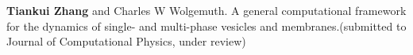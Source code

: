 
\begin{cventries}

  \cventry
    {} %
    {} %
    {} %
    {} %
    {
      \begin{cvitems} %
      	\item {\textbf{Tiankui Zhang} and Charles W Wolgemuth. A general computational framework for the dynamics of single- and multi-phase vesicles and membranes.(submitted to Journal of Computational Physics, under review)}
      \end{cvitems}
    }
\end{cventries}